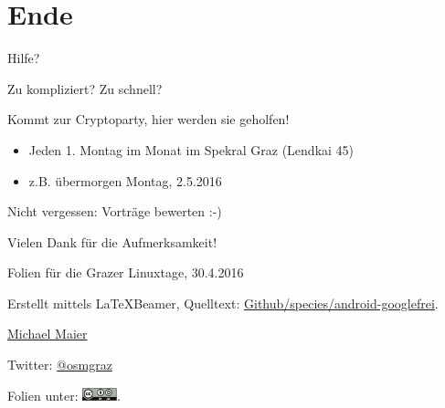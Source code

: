 \documentclass{beamer}
\begin{document}
\section{Ende}

\begin{frame}{Hilfe?}

  Zu kompliziert? Zu schnell?
    \vspace{1cm}

  \pause

  Kommt zur Cryptoparty, hier werden sie geholfen!

  \begin{itemize}
    \item Jeden 1. Montag im Monat im Spekral Graz (Lendkai 45)
    \item z.B. übermorgen Montag, 2.5.2016
  \end{itemize}

    \vspace{1cm}
      Nicht vergessen: Vorträge bewerten :-)

\end{frame}

\begin{frame}{Vielen Dank für die Aufmerksamkeit!}

  Folien für die Grazer Linuxtage, 30.4.2016
\vspace{1cm}

Erstellt mittels \LaTeX Beamer, Quelltext: \href{https://github.com/species/android-googlefrei}{Github/species/android-googlefrei}.
\vspace{1cm}

\href{mailto:michael.maier@mailbox.org}{Michael Maier}

Twitter: \href{https://twitter.com/osmgraz}{@osmgraz}
\vspace{1cm}

Folien unter: \includegraphics[width=1cm]{cc-by-sa.pdf}. 


\end{frame}
\end{document}
